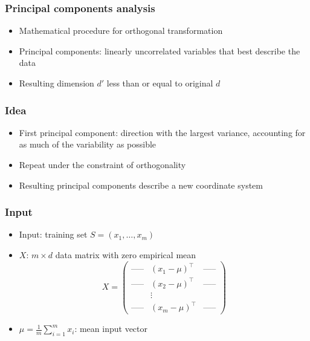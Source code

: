 \documentclass[10pt]{beamer}
\begin{document}
\begin{frame}
  \frametitle{Principal components analysis}
  \begin{itemize}
	\item Mathematical procedure for orthogonal transformation
	\item {\color{red} Principal components}: linearly uncorrelated variables that best describe the data
	\item Resulting dimension $d'$ less than or equal to original $d$
  \end{itemize}
\end{frame}

\begin{frame}
  \frametitle{Idea}
  \begin{itemize}
	\item First principal component: direction with the largest {\color{red} variance},
		accounting for as much of the variability as possible
	\item Repeat under the constraint of orthogonality
	\item Resulting principal components describe a new coordinate system
  \end{itemize}
\end{frame}

\begin{frame}
  \frametitle{Input}
  \begin{itemize}
	\item Input: training set $S=(x_1,\ldots,x_m)$
	\item $X$: $m\times d$ data matrix with {\color{red} zero empirical mean}
	\[X = \left( \begin{array}{ccc} \textrm{-----} & (x_1 - \mu)^\top & \textrm{-----} \\ \textrm{-----} & (x_2 - \mu)^\top & \textrm{-----} \\ & \vdots & \\ \textrm{-----} & (x_m - \mu)^\top & \textrm{-----} \end{array} \right)\]
	\item $\mu = \frac 1 m \sum_{i=1}^m x_i$: {\color{red} mean} input vector
  \end{itemize}
\end{frame}
\end{document}
